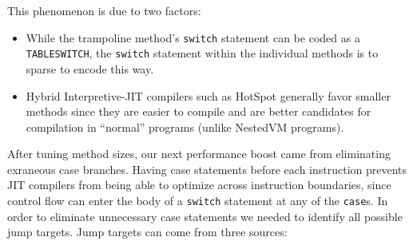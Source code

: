 \documentclass{acmconf}
\begin{document}


This phenomenon is due to two factors:

\begin{itemize}

\item While the trampoline method's {\tt switch} statement can be
      coded as a {\tt TABLESWITCH}, the {\tt switch} statement
      within the individual methods is to sparse to encode this way.

\item Hybrid Interpretive-JIT compilers such as HotSpot generally
      favor smaller methods since they are easier to compile and are
      better candidates for compilation in ``normal'' programs (unlike
      NestedVM programs).

\end{itemize}

After tuning method sizes, our next performance boost came from
eliminating exraneous case branches.  Having case statements before
each instruction prevents JIT compilers from being able to optimize
across instruction boundaries, since control flow can enter the body
of a {\tt switch} statement at any of the {\tt case}s.  In order to
eliminate unnecessary case statements we needed to identify all
possible jump targets.  Jump targets can come from three sources:
\end{document}
